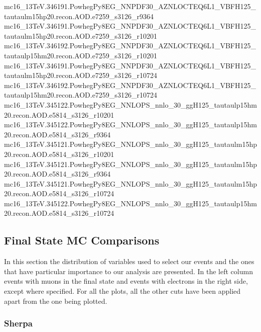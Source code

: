{mc16\_13TeV.346191.PowhegPy8EG\_NNPDF30\_AZNLOCTEQ6L1\_VBFH125\_tautaulm15hp20.recon.AOD.e7259\_s3126\_r9364\newline  
mc16\_13TeV.346191.PowhegPy8EG\_NNPDF30\_AZNLOCTEQ6L1\_VBFH125\_tautaulm15hp20.recon.AOD.e7259\_s3126\_r10201\newline  
mc16\_13TeV.346192.PowhegPy8EG\_NNPDF30\_AZNLOCTEQ6L1\_VBFH125\_tautaulp15hm20.recon.AOD.e7259\_s3126\_r10201\newline  
mc16\_13TeV.346191.PowhegPy8EG\_NNPDF30\_AZNLOCTEQ6L1\_VBFH125\_tautaulm15hp20.recon.AOD.e7259\_s3126\_r10724\newline  
mc16\_13TeV.346192.PowhegPy8EG\_NNPDF30\_AZNLOCTEQ6L1\_VBFH125\_tautaulp15hm20.recon.AOD.e7259\_s3126\_r10724\newline  
mc16\_13TeV.345122.PowhegPy8EG\_NNLOPS\_nnlo\_30\_ggH125\_tautaulp15hm20.recon.AOD.e5814\_s3126\_r10201\newline  
mc16\_13TeV.345122.PowhegPy8EG\_NNLOPS\_nnlo\_30\_ggH125\_tautaulp15hm20.recon.AOD.e5814\_s3126\_r9364\newline  
mc16\_13TeV.345121.PowhegPy8EG\_NNLOPS\_nnlo\_30\_ggH125\_tautaulm15hp20.recon.AOD.e5814\_s3126\_r10201\newline  
mc16\_13TeV.345121.PowhegPy8EG\_NNLOPS\_nnlo\_30\_ggH125\_tautaulm15hp20.recon.AOD.e5814\_s3126\_r9364\newline  
mc16\_13TeV.345121.PowhegPy8EG\_NNLOPS\_nnlo\_30\_ggH125\_tautaulm15hp20.recon.AOD.e5814\_s3126\_r10724\newline  
mc16\_13TeV.345122.PowhegPy8EG\_NNLOPS\_nnlo\_30\_ggH125\_tautaulp15hm20.recon.AOD.e5814\_s3126\_r10724}	

\clearpage
\subsection{Final State MC Comparisons}\label{DistComparisons}
In this section the distribution of variables used to select our events and the ones that have particular importance to our analysis are presented. In the left column events with muons in the final state and events with electrons in the right side, except where specified. For all the plots, all the other cuts have been applied apart from the one being plotted.
\subsubsection{Sherpa}


